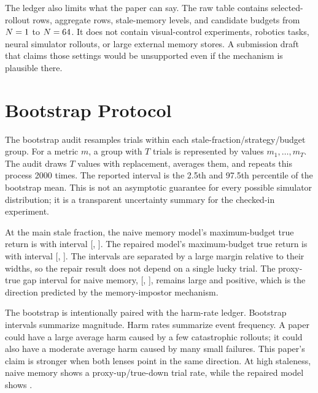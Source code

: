 \documentclass{article}
\begin{document}
The ledger also limits what the paper can say. The raw table contains
\EvidenceRawRows{} selected-rollout rows, \EvidenceSummaryRows{} aggregate rows,
\EvidenceStaleLevels{} stale-memory levels, and candidate budgets from
$N=1{}$ to $N=64{}$. It does not contain visual-control
experiments, robotics tasks, neural simulator rollouts, or large external
memory stores. A submission draft that claims those settings would be
unsupported even if the mechanism is plausible there.

\section{Bootstrap Protocol}
\label{app:bootstrap}

The bootstrap audit resamples trials within each
stale-fraction/strategy/budget group. For a metric $m$, a group with $T$ trials
is represented by values $m_1,\ldots,m_T$. The audit draws $T$ values with
replacement, averages them, and repeats this process 2000 times. The reported
interval is the 2.5th and 97.5th percentile of the bootstrap mean. This is not
an asymptotic guarantee for every possible simulator distribution; it is a
transparent uncertainty summary for the checked-in experiment.

At the main stale fraction, the naive memory model's maximum-budget true
return is \EvidenceNaiveMaxTrue{} with interval
[\EvidenceNaiveMaxTrueCILow{}, \EvidenceNaiveMaxTrueCIHigh{}]. The repaired model's
maximum-budget true return is \EvidenceRepairedMaxTrue{} with interval
[\EvidenceRepairedMaxTrueCILow{}, \EvidenceRepairedMaxTrueCIHigh{}]. The intervals
are separated by a large margin relative to their widths, so the repair result
does not depend on a single lucky trial. The proxy-true gap interval for naive
memory, [\EvidenceNaiveMaxGapCILow{}, \EvidenceNaiveMaxGapCIHigh{}], remains large
and positive, which is the direction predicted by the memory-impostor
mechanism.

The bootstrap is intentionally paired with the harm-rate ledger. Bootstrap
intervals summarize magnitude. Harm rates summarize event frequency. A paper
could have a large average harm caused by a few catastrophic rollouts; it could
also have a moderate average harm caused by many small failures. This paper's
claim is stronger when both lenses point in the same direction. At high
staleness, naive memory shows a \EvidenceNaiveHarmRate{} proxy-up/true-down
trial rate, while the repaired model shows \EvidenceRepairedHarmRate{}.
\end{document}
